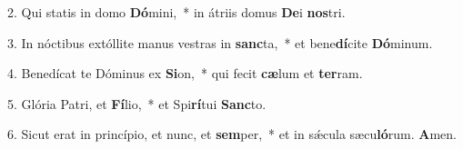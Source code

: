 2. Qui statis in domo \textbf{Dó}mini,~*  in átriis domus \textbf{De}i \textbf{nos}tri.\

3. In nóctibus extóllite manus vestras in \textbf{sanc}ta,~*  et bene\textbf{dí}cite \textbf{Dó}minum.\

4. Benedícat te Dóminus ex \textbf{Si}on,~*  qui fecit \textbf{cæ}lum et \textbf{ter}ram.\

5. Glória Patri, et \textbf{Fí}lio,~*  et Spi\textbf{rí}tui \textbf{Sanc}to.\

6. Sicut erat in princípio, et nunc, et \textbf{sem}per,~*  et in sǽcula sæcu\textbf{ló}rum. \textbf{A}men.\

